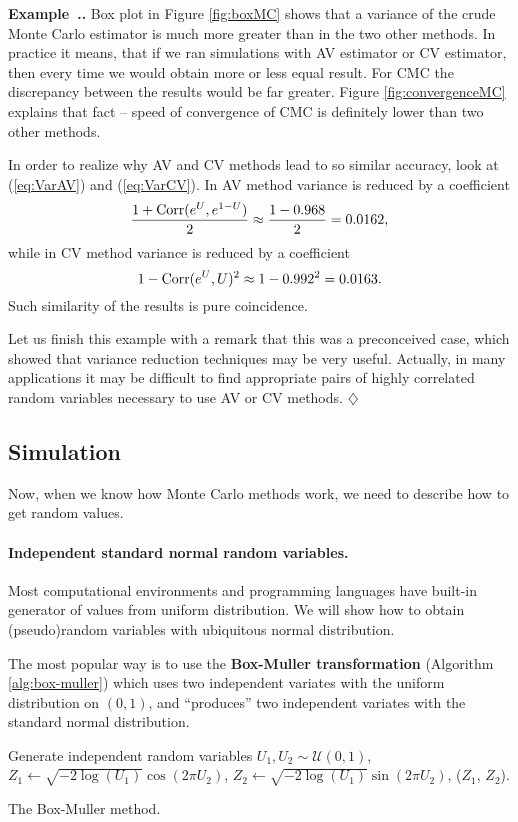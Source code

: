 \documentclass[a4paper,11pt, twoside]{book}
\theoremstyle{definition}
\theoremstyle{remark}
\newcounter{example}[chapter]
\newenvironment{example}
   {\refstepcounter{example} \par\medskip\noindent \textbf{Example~\arabic{chapter}.\arabic{example}.}  }
   {\hfill $\diamondsuit$\par\noindent\ignorespacesafterend}
\def\Corr{{\hbox{Corr}}}
\begin{document}
\begin{example}
Box plot in Figure \ref{fig:boxMC} shows that a variance of the crude Monte Carlo estimator is much more greater than in the two other methods. In practice it means, that if we ran simulations with AV estimator or CV estimator, then every time we would obtain more or less equal result. For CMC the discrepancy between the results would be far greater.
Figure \ref{fig:convergenceMC} explains that fact -- speed of convergence of CMC is definitely lower than two other methods.

In order to realize why AV and CV methods lead to so similar accuracy, look at (\ref{eq:VarAV}) and (\ref{eq:VarCV}). In AV method variance is reduced by a coefficient
\[ \frac{1 + \Corr(e^U, e^{1-U})}{2} \approx \frac{1 - 0.968}{2} = 0.0162, \]
while in CV method variance is reduced by a coefficient
\[ 1 - \Corr(e^U, U)^2 \approx 1 - 0.992^2 = 0.0163. \]
Such similarity of the results is pure coincidence.

Let us finish this example with a remark that this was a preconceived case, which showed that variance reduction techniques may be very useful. Actually, in many applications it may be difficult to find appropriate pairs of highly correlated random variables necessary to use AV or CV methods.
\end{example}


\subsection{Simulation}
Now, when we know how Monte Carlo methods work, we need to describe how to get random values.
\paragraph{Independent standard normal random variables.} Most computational environments and programming languages have built-in generator of values from uniform distribution. We will show how to obtain (pseudo)random variables with ubiquitous normal distribution.

The most popular way is to use the \textbf{Box-Muller transformation} (Algorithm \ref{alg:box-muller}) which uses two independent variates with the uniform distribution on $(0,1)$, and ``produces'' two independent variates with the standard normal distribution.
\begin{algorithm}[!ht]
 \begin{algorithmic}[1]
    \State Generate independent random variables $U_1, U_2 \sim \mathcal{U}(0,1)$,
    \State $Z_1 \gets \sqrt{-2\log(U_1)} \cos(2\pi U_2)$,
    \State $Z_2 \gets \sqrt{-2\log(U_1)} \sin(2\pi U_2)$,
    \State \Return ($Z_1$, $Z_2$).
  \EndFunction
 \end{algorithmic}
 \caption{The Box-Muller method.}
 \label{alg:box-muller}
\end{algorithm}
\end{document}
